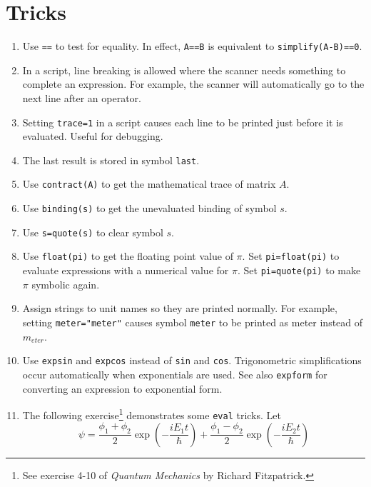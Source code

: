

\section*{Tricks}

\begin{enumerate}

\item
Use \verb$==$ to test for equality.
In effect, \verb$A==B$ is equivalent to \verb$simplify(A-B)==0$.

\item
In a script, line breaking is allowed where the scanner needs something to complete an expression.
For example, the scanner will automatically go to the next line after an operator.

\item
Setting \verb$trace=1$ in a script causes each line to be printed just before it is evaluated.
Useful for debugging.

\item
The last result is stored in symbol \verb$last$.

\item
Use \verb$contract(A)$ to get the mathematical trace of matrix $A$.

\item
Use \verb$binding(s)$ to get the unevaluated binding of symbol $s$.

\item
Use \verb$s=quote(s)$ to clear symbol $s$.

\item
Use \verb$float(pi)$ to get the floating point value of $\pi$.
Set \verb$pi=float(pi)$ to evaluate expressions with a numerical value for $\pi$.
Set \verb$pi=quote(pi)$ to make $\pi$ symbolic again.

\item
Assign strings to unit names so they are printed normally.
For example, setting \verb$meter="meter"$ causes symbol \verb$meter$
to be printed as meter instead of $m_{eter}$.

\item
Use \verb$expsin$ and \verb$expcos$ instead of \verb$sin$ and \verb$cos$.
Trigonometric simplifications occur automatically when exponentials are used.
See also \verb$expform$ for converting an expression to exponential form.

\item
The following exercise\footnote{See exercise 4-10 of {\it Quantum Mechanics} by Richard Fitzpatrick.}
demonstrates some \verb$eval$ tricks.
Let
\begin{equation*}
\psi
=\frac{\phi_1+\phi_2}{2}\exp\left(-\frac{iE_1t}{\hbar}\right)
+\frac{\phi_1-\phi_2}{2}\exp\left(-\frac{iE_2t}{\hbar}\right)
\end{equation*}


\end{enumerate}
